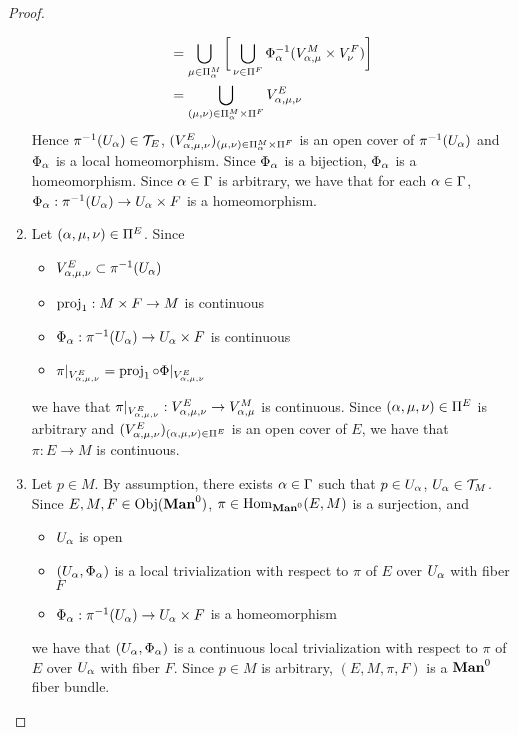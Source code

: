 \documentclass{book}
\begin{document}
\begin{proof}
\begin{enumerate}
\begin{align*}
				& = \bigcup_{\mu \in \Pi^M_{\alpha}} \bigg[ \bigcup_{\nu \in \Pi^F}\Phi_{\alpha}^{-1} ( V^M_{\alpha, \mu} \times V^F_{\nu} ) \bigg] \\
				& = \bigcup_{(\mu, \nu) \in \Pi^M_{\alpha} \times \Pi^F} V^E_{\alpha, \mu, \nu} 
			\end{align*}
			Hence $\pi^{-1}(U_{\alpha}) \in \mathcal{T}_E$, $(V^E_{\alpha, \mu, \nu})_{(\mu, \nu) \in \Pi^M_{\alpha} \times \Pi^F}$ is an open cover of $\pi^{-1}(U_{\alpha})$ and $\Phi_{\alpha}$ is a local homeomorphism. Since $\Phi_{\alpha}$ is a bijection, $\Phi_{\alpha}$ is a homeomorphism. Since $\alpha \in \Gamma$ is arbitrary, we have that for each $\alpha \in \Gamma$, $\Phi_{\alpha}: \pi^{-1}(U_{\alpha}) \rightarrow U_{\alpha} \times F$ is a homeomorphism.
			\item Let $(\alpha, \mu, \nu) \in \Pi^E$. Since 
			\begin{itemize}
				\item $V^E_{\alpha, \mu, \nu} \subset \pi^{-1}(U_{\alpha})$
				\item $\operatorname{\text{proj}}_1: M \times F \rightarrow M$ is continuous
				\item $\Phi_{\alpha}: \pi^{-1}(U_{\alpha}) \rightarrow U_{\alpha} \times F$ is continuous
				\item $\pi|_{V^E_{\alpha, \mu, \nu}} = \operatorname{\text{proj}}_1 \circ \Phi|_{V^E_{\alpha, \mu, \nu}}$
			\end{itemize}
			we have that $\pi|_{V^E_{\alpha, \mu, \nu}}: V^E_{\alpha, \mu, \nu} \rightarrow V^M_{\alpha, \mu}$ is continuous. Since $(\alpha, \mu, \nu) \in \Pi^E$ is arbitrary and $(V^E_{\alpha, \mu, \nu})_{(\alpha, \mu, \nu) \in \Pi^E }$ is an open cover of $E$, we have that $\pi:E \rightarrow M$ is continuous.
			\item Let $p \in M$. By assumption, there exists $\alpha \in \Gamma$ such that $p \in U_{\alpha}$, $U_{\alpha} \in \mathcal{T}_M$. Since $E,M,F \in \Obj(\Man0)$, $\pi \in \Hom_{\Man0}(E,M)$ is a surjection, and 
			\begin{itemize}
				\item $U_{\alpha}$ is open
				\item $(U_{\alpha}, \Phi_{\alpha})$ is a local trivialization with respect to $\pi$ of $E$ over $U_{\alpha}$ with fiber $F$
				\item $\Phi_{\alpha}: \pi^{-1}(U_{\alpha}) \rightarrow U_{\alpha} \times F$ is a homeomorphism
			\end{itemize}
			we have that $(U_{\alpha}, \Phi_{\alpha})$ is a continuous local trivialization with respect to $\pi$ of $E$ over $U_{\alpha}$ with fiber $F$. Since $p \in M$ is arbitrary, $(E, M, \pi, F)$ is a $\Man0$ fiber bundle.  
		\end{enumerate}
	\end{proof}
	
\end{document}
